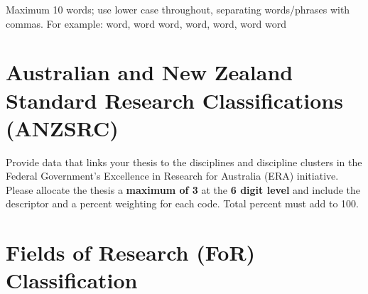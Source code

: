 \begin{instructional}
	Maximum 10 words; use lower case throughout, separating words/phrases with commas. For example: word, word word, word, word, word word
\end{instructional}




\section*{Australian and New Zealand Standard Research Classifications (ANZSRC)}

\begin{instructional}
    Provide data that links your thesis to the disciplines and discipline clusters in the Federal Government’s Excellence in Research for Australia (ERA) initiative.\\
    
    \noindent
    Please allocate the thesis a \textbf{maximum of 3} \href{http://www.abs.gov.au/Ausstats/abs@.nsf/Latestproducts/6BB427AB9696C225CA2574180004463E?opendocument}{\color{blue}{Australian and New Zealand Standard Research Classifications (ANZSRC) codes}} at the \textbf{6 digit level} and include the descriptor and a percent weighting for each code. Total percent must add to 100.\\




\end{instructional}





\section*{Fields of Research (FoR) Classification}

    
